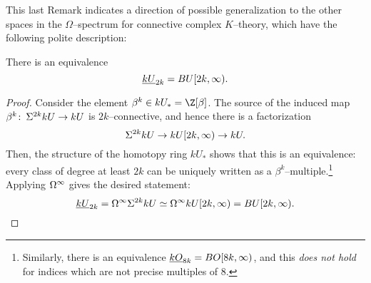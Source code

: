 This last Remark indicates a direction of possible generalization to the other spaces in the \(\Omega\)--spectrum for connective complex \(K\)--theory, which have the following polite description:
\begin{lemma}
There is an equivalence \[\OS{kU}{2k} = BU[2k, \infty).\]
\end{lemma}
\begin{proof}
Consider the element \(\beta^k \in kU_* = \Z[\beta]\).  The source of the induced map \(\beta^k\colon\thinspace \Sigma^{2k} kU \to kU\) is \(2k\)--connective, and hence there is a factorization \[\Sigma^{2k} kU \to kU[2k, \infty) \to kU.\]  Then, the structure of the homotopy ring \(kU_*\) shows that this is an equivalence: every class of degree at least \(2k\) can be uniquely written as a \(\beta^k\)--multiple.\footnote{Similarly, there is an equivalence \(\OS{kO}{8k} = BO[8k, \infty)\), and this \emph{does not hold} for indices which are not precise multiples of \(8\).}  Applying \(\Omega^\infty\) gives the desired statement: \[\OS{kU}{2k} = \Loops^\infty \Susp^{2k} kU \simeq \Loops^\infty kU[2k, \infty) = BU[2k, \infty). \qedhere\]
\end{proof}

